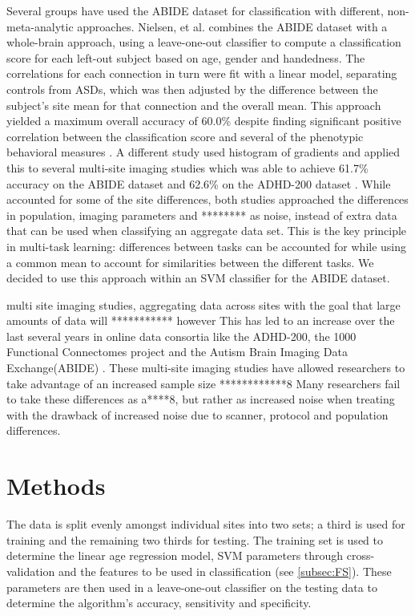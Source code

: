 \documentclass{llncs}
\begin{document}
Several groups have used the ABIDE dataset for classification with different, non-meta-analytic approaches. Nielsen, et al. combines the ABIDE dataset with a whole-brain approach, using a leave-one-out classifier to compute a classification score for each left-out subject based on age, gender and handedness.  The correlations for each connection in turn were fit with a linear model, separating controls from ASDs, which was then adjusted by the difference between the subject's site mean for that connection and the overall mean.  This approach yielded a maximum overall accuracy of 60.0\% despite finding significant positive correlation between the classification score and several of the phenotypic behavioral measures \cite{Jared}. A different study used histogram of gradients and applied this to several multi-site imaging studies which was able to achieve 61.7\% accuracy on the ABIDE dataset and 62.6\% on the ADHD-200 dataset \cite{ghiassian}. While \cite{Jared} accounted for some of the site differences, both studies approached the differences in population, imaging parameters and ******** as noise, instead of extra data that can be used when classifying an aggregate data set.  
This is the key principle in multi-task learning: differences between tasks can be accounted for while using a common mean to account for similarities between the different tasks.  We decided to use this approach within an SVM classifier for the ABIDE dataset. 




multi site imaging studies, aggregating data across sites with the goal that large amounts of data will 
*********** however   This has led to an increase over the last several years in online data consortia like the ADHD-200, the 1000 Functional Connectomes project and the Autism Brain Imaging Data Exchange(ABIDE) \cite{adhd}\cite{fcon}\cite{abide}.  These multi-site imaging studies have allowed researchers to take advantage of an increased sample size  ************8       Many researchers fail to take these differences as a****8, but rather as increased noise when treating with the drawback of increased noise due to scanner, protocol and population differences. 
\section{Methods}
The data is split evenly amongst individual sites into two sets; a third is used for training and the remaining two thirds for testing.   The training set is used to determine the linear age regression model, SVM parameters through cross-validation and the features to be used in classification (see \ref{subsec:FS}).  These parameters are then used in a leave-one-out classifier on the testing data to determine the algorithm's accuracy, sensitivity and specificity. 
\end{document}
